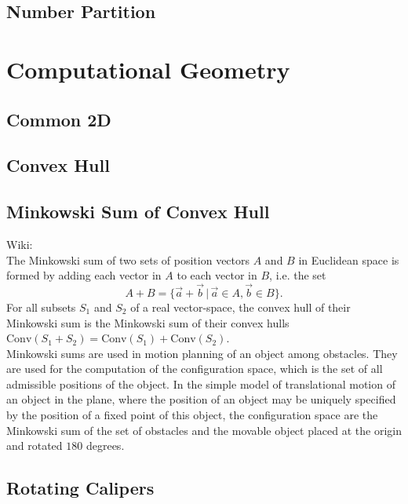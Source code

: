 \documentclass[10pt]{article}
\begin{document}
\subsection{Number Partition} {

\section{Computational Geometry}
\subsection{Common 2D}

\subsection{Convex Hull}

\subsection{Minkowski Sum of Convex Hull}
\noindent
Wiki: \\
The Minkowski sum of two sets of position vectors $A$ and $B$ in Euclidean space is formed by adding each vector in $A$ to each vector in $B$, i.e. the set
\begin{displaymath}
A+B=\{ \vec{a} + \vec{b} \, | \, \vec{a} \in A, \vec{b} \in B \}.
\end{displaymath}
For all subsets $S_1$ and $S_2$ of a real vector-space, the convex hull of their Minkowski sum is the Minkowski sum of their convex hulls $\mathrm{Conv} (S_1 + S_2) = \mathrm{Conv} (S_1) + \mathrm{Conv} (S_2)$. \\
Minkowski sums are used in motion planning of an object among obstacles. They are used for the computation of the configuration space, which is the set of all admissible positions of the object. In the simple model of translational motion of an object in the plane, where the position of an object may be uniquely specified by the position of a fixed point of this object, the configuration space are the Minkowski sum of the set of obstacles and the movable object placed at the origin and rotated $180$ degrees. \\

\subsection{Rotating Calipers}

}
\end{document}
